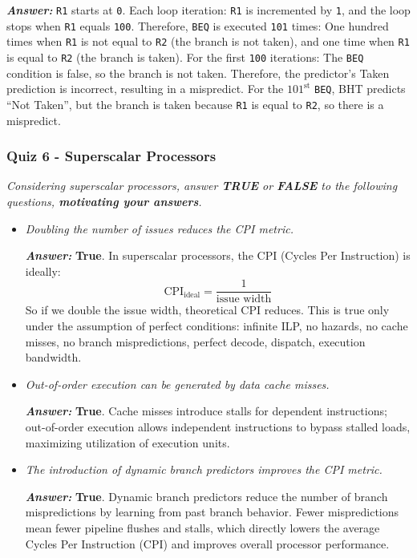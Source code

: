 \highspace
\textcolor{Green3}{\textbf{\emph{Answer:}}} \texttt{R1} starts at \texttt{0}. Each loop iteration: \texttt{R1} is incremented by \texttt{1}, and the loop stops when \texttt{R1} equals \texttt{100}. Therefore, \texttt{BEQ} is executed \texttt{101} times: One hundred times when \texttt{R1} is not equal to \texttt{R2} (the branch is not taken), and one time when \texttt{R1} is equal to \texttt{R2} (the branch is taken). For the first \texttt{100} iterations: The \texttt{BEQ} condition is false, so the branch is not taken. Therefore, the predictor's Taken prediction is incorrect, resulting in a mispredict. For the $101^{\text{st}}$ \texttt{BEQ}, BHT predicts ``Not Taken'', but the branch is taken because \texttt{R1} is equal to \texttt{R2}, so there is a mispredict.

\newpage

\subsubsection*{Quiz 6 - Superscalar Processors}

\emph{Considering superscalar processors, answer \textbf{TRUE} or \textbf{FALSE} to the following questions, \textbf{motivating your answers}.}

\begin{itemize}
    \item \emph{Doubling the number of issues reduces the CPI metric.}

    \textcolor{Green3}{\textbf{\emph{Answer:}}} \textbf{True}. In superscalar processors, the CPI (Cycles Per Instruction) is ideally:
    \begin{equation*}
        \text{CPI}_{\text{ideal}} = \dfrac{1}{\text{issue width}}
    \end{equation*}
    So if we double the issue width, theoretical CPI reduces. This is true only under the assumption of perfect conditions: infinite ILP, no hazards, no cache misses, no branch mispredictions, perfect decode, dispatch, execution bandwidth.

    
    \item \emph{Out-of-order execution can be generated by data cache misses.}

    \textcolor{Green3}{\textbf{\emph{Answer:}}} \textbf{True}. Cache misses introduce stalls for dependent instructions; out-of-order execution allows independent instructions to bypass stalled loads, maximizing utilization of execution units.


    \item \emph{The introduction of dynamic branch predictors improves the CPI metric.}

    \textcolor{Green3}{\textbf{\emph{Answer:}}} \textbf{True}. Dynamic branch predictors reduce the number of branch mispredictions by learning from past branch behavior. Fewer mispredictions mean fewer pipeline flushes and stalls, which directly lowers the average Cycles Per Instruction (CPI) and improves overall processor performance.
\end{itemize}